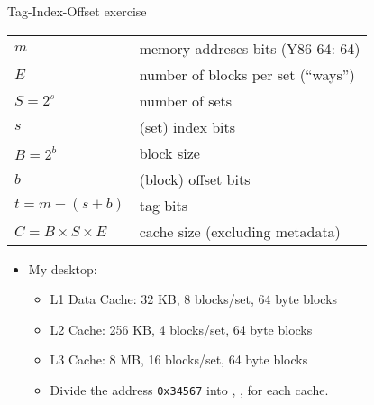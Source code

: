 \begin{frame}{Tag-Index-Offset exercise}

{\fontsize{12}{13}\selectfont
\begin{tabular}{ll}
$m$ & memory addreses bits (Y86-64: 64) \\
$E$ & number of blocks per set (``ways'') \\
$S=2^s$ & number of sets \\
$s$  & (set) index bits \\
$B=2^b$ & block size \\
$b$ & (block) offset bits \\
$t = m - (s+b)$ & tag bits \\
$C = B \times S \times E$ & cache size (excluding metadata) \\
\end{tabular}
}
    \begin{itemize}
        \item My desktop:
            \begin{itemize}
        \item L1 Data Cache: 32 KB, 8 blocks/set, 64 byte blocks
        \item L2 Cache: 256 KB, 4 blocks/set, 64 byte blocks
        \item L3 Cache: 8 MB, 16 blocks/set, 64 byte blocks
            \end{itemize}
        \begin{itemize}
            \item Divide the address {\tt 0x34567} into , ,  for each cache.
        \end{itemize}
    \end{itemize} 
\end{frame}


